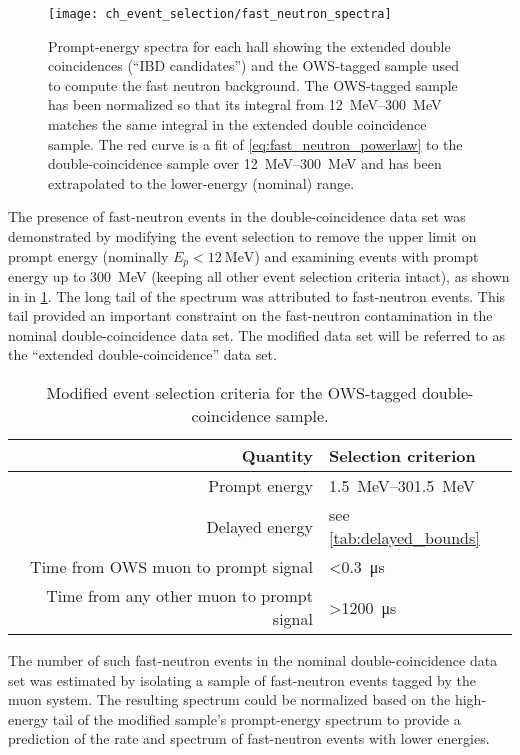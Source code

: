 \begin{figure}
    \centering
    \texttt{[image: ch\_event\_selection/fast\_neutron\_spectra]}
    \caption[Fast neutron spectrum]{
        Prompt-energy spectra for each hall
        showing the extended double coincidences (``IBD candidates'')
        and the OWS-tagged sample used to compute the fast neutron background.
        The OWS-tagged sample has been normalized
        so that its integral from \SIrange{12}{300}{\MeV}
        matches the same integral in the extended double coincidence sample.
        The red curve is a fit of \cref{eq:fast_neutron_powerlaw}
        to the double-coincidence sample over \SIrange{12}{300}{\MeV}
        and has been extrapolated to the lower-energy (nominal) range.
    }
    \label{fig:fast_neutron}
\end{figure}

The presence of fast-neutron events in the double-coincidence data set
was demonstrated by modifying the event selection
to remove the upper limit on prompt energy (nominally $E_p < \SI{12}{\MeV}$)
and examining events with prompt energy up to \SI{300}{\MeV}
(keeping all other event selection criteria intact),
as shown in in \cref{fig:fast_neutron}.
The long tail of the spectrum was attributed to fast-neutron events.
This tail provided an important constraint on the fast-neutron contamination
in the nominal double-coincidence data set.
The modified data set will be referred to as the
``extended double-coincidence'' data set.

\begin{table}[ht]
    \centering
    \caption[OWS tag criteria]{
        Modified event selection criteria for the OWS-tagged
        double-coincidence sample.
    }
    \label{tab:fast_neutron}
    \begin{tabular}[t]{rl}
        \toprule
        Quantity & Selection criterion \\
        \midrule
        Prompt energy & \SIrange{1.5}{301.5}{\MeV} \\
        Delayed energy & see \cref{tab:delayed_bounds} \\
        Time from OWS muon to prompt signal & \SI{<0.3}{\us} \\
        Time from any other muon to prompt signal & \SI{>1200}{\us} \\
        \bottomrule
    \end{tabular}
\end{table}


The number of such fast-neutron events in the nominal double-coincidence data set
was estimated by isolating a sample of fast-neutron events
tagged by the muon system.
The resulting spectrum could be normalized based on the high-energy tail
of the modified sample's prompt-energy spectrum
to provide a prediction of the rate and spectrum of fast-neutron events
with lower energies.

